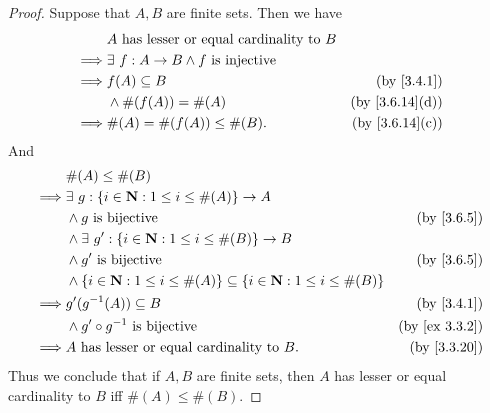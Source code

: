 \begin{proof}
  Suppose that \(A, B\) are finite sets.
  Then we have
  \begin{align*}
             & A \text{ has lesser or equal cardinality to } B                                  \\
    \implies & \exists\ f : A \to B \land f \text{ is injective}                                \\
    \implies & f(A) \subseteq B                                  & \text{(by \cref{3.4.1})}     \\
             & \land \#(f(A)) = \#(A)                            & \text{(by \cref{3.6.14}(d))} \\
    \implies & \#(A) = \#(f(A)) \leq \#(B).                      & \text{(by \cref{3.6.14}(c))}
  \end{align*}
  And
  \begin{align*}
             & \#(A) \leq \#(B)                                                                                                    \\
    \implies & \exists\ g : \{i \in \N : 1 \leq i \leq \#(A)\} \to A                                                               \\
             & \land g \text{ is bijective}                                                          & \text{(by \cref{3.6.5})}    \\
             & \land \exists\ g' : \{i \in \N : 1 \leq i \leq \#(B)\} \to B                                                        \\
             & \land g' \text{ is bijective}                                                         & \text{(by \cref{3.6.5})}    \\
             & \land \{i \in \N : 1 \leq i \leq \#(A)\} \subseteq \{i \in \N : 1 \leq i \leq \#(B)\}                               \\
    \implies & g'(g^{-1}(A)) \subseteq B                                                             & \text{(by \cref{3.4.1})}    \\
             & \land g' \circ g^{-1} \text{ is bijective}                                            & \text{(by \cref{ex 3.3.2})} \\
    \implies & A \text{ has lesser or equal cardinality to } B.                                      & \text{(by \cref{3.3.20})}
  \end{align*}
  Thus we conclude that if \(A, B\) are finite sets, then \(A\) has lesser or equal cardinality to \(B\) iff \(\#(A) \leq \#(B)\).
\end{proof}

